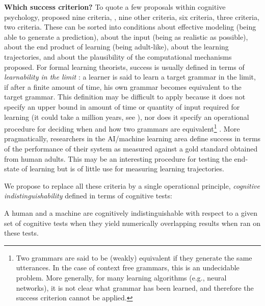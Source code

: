 \documentclass[jou,apacite]{apa6}
\renewcommand{\subsubsection}[1]{\textbf{#1}\hspace{0.3cm}}
\begin{document}
\subsubsection{Which success criterion?}
To quote a few proposals within cognitive psychology,  proposed nine criteria, , nine other criteria,   six criteria,  three criteria,  two criteria. These can be sorted into conditions about effective modeling (being able to generate a prediction), about the input (being as realistic as possible), about the end product of learning (being adult-like), about the learning trajectories, and about the plausibility of the computational mechanisms proposed.  For formal learning theorists, success is usually defined in terms of \emph{learnability in the limit} \cite{gold_1967}: a learner is said to learn a target grammar in the limit, if after a finite amount of time, his own grammar becomes equivalent to the target grammar. This definition may be difficult to apply because it does not specify an upper bound in amount of time or quantity of input required for learning (it could take a million years, see ), nor does it specify an operational procedure for deciding when and how two grammars are equivalent\footnote{Two grammars are said to be (weakly) equivalent if they generate the same utterances. In the case of context free grammars, this is an undecidable problem. More generally, for many learning algorithms (e.g., neural networks), it is not clear what grammar has been learned, and therefore the success criterion cannot be applied.} .  More pragmatically, researchers in the AI/machine learning area define success in terms of the performance of their system as measured against a gold standard obtained from human adults. This may be an interesting procedure for testing the end-state of learning but is of little use for measuring learning trajectories.


We propose to replace all these criteria by a single operational principle, \textit{cognitive indistinguishability} defined in terms of cognitive tests:

\begin{displayquote}
	A human and a machine are cognitively indistinguishable with respect to a given set of cognitive tests when they yield numerically overlapping results when ran on these tests.
\end{displayquote}
\end{document}
